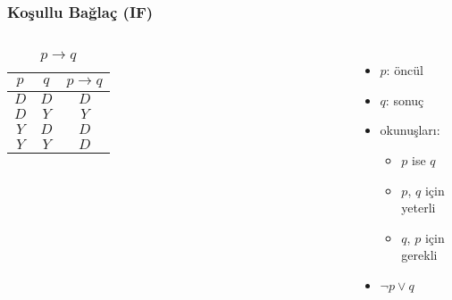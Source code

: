 \documentclass[dvipsnames]{beamer}
\theoremstyle{definition}
\theoremstyle{example}
\theoremstyle{plain}
\begin{document}
\begin{frame}
  \frametitle{Koşullu Bağlaç (IF)}

  \begin{columns}
    \begin{table}
      \caption{$p \rightarrow q$}
      \begin{tabular}{|c|c||c|}\hline
        $p$ & $q$ & $p \rightarrow q$\\\hline\hline
        $D$ & $D$ & $D$\\\hline
        $D$ & $Y$ & $Y$\\\hline
        $Y$ & $D$ & $D$\\\hline
        $Y$ & $Y$ & $D$\\\hline
      \end{tabular}
    \end{table}

    \pause
    \begin{itemize}
      \item $p$: \alert{öncül}
      \item $q$: \alert{sonuç}

      \item okunuşları:
      \begin{itemize}
        \item $p$ ise $q$
        \item $p$, $q$ için yeterli
        \item $q$, $p$ için gerekli
      \end{itemize}

      \pause
      \item $\neg p \vee q$
    \end{itemize}
  \end{columns}
\end{frame}
\end{document}
